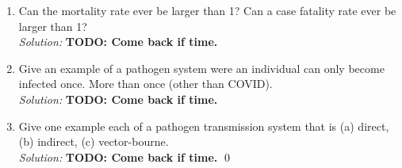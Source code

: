 \documentclass[10pt]{amsart}
\theoremstyle{nonumberplain}
\begin{document}
\begin{enumerate}[label={\bf {Question \arabic*}}]
\begin{enumerate}
\item Can the mortality rate ever be larger than 1? Can a case fatality rate ever be larger than 1? \\
\textit{Solution:}
\textbf{TODO: Come back if time.}

\item Give an example of a pathogen system were an individual can only become infected once. More than once (other than COVID). \\
\textit{Solution:}
\textbf{TODO: Come back if time.}

\item Give one example each of a pathogen transmission system that is (a) direct, (b) indirect, (c) vector-bourne. \\
\textit{Solution:}
\textbf{TODO: Come back if time.}
\qed \\

\end{enumerate}

\end{enumerate}
\end{document}
